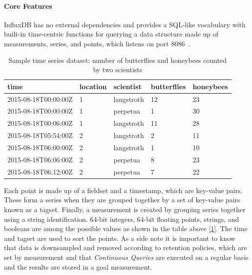 \paragraph{Core Features}
InfluxDB has no external dependencies and provides a SQL-like vocabulary with built-in time-centric functions for querying a data structure made up of measurements, series, and points, which listens on port 8086~\cite{Misc:influx_docs}.

\begin{table}[ht]
    \centering
    \begin{tabular}{|l|l|l|l|l|}
        \hline
        time                 & location & scientist  & butterflies & honeybees \\ \hline
        2015-08-18T00:00:00Z & 1        & langstroth & 12          & 23        \\ \hline
        2015-08-18T00:00:00Z & 1        & perpetua   & 1           & 30        \\ \hline
        2015-08-18T00:06:00Z & 1        & langstroth & 11          & 28        \\ \hline
        2015-08-18T05:54:00Z & 2        & langstroth & 2           & 11        \\ \hline
        2015-08-18T06:00:00Z & 2        & langstroth & 1           & 10        \\ \hline
        2015-08-18T06:06:00Z & 2        & perpetua   & 8           & 23        \\ \hline
        2015-08-18T06:12:00Z & 2        & perpetua   & 7           & 22        \\ \hline
    \end{tabular}
    \caption{Sample time series dataset: number of butterflies and honeybees counted by two scientists}\label{tab:influx_example}
\end{table}
Each point is made up of a fieldset and a timestamp, which are key-value pairs. These form a series when they are grouped together by a set of key-value pairs known as a tagset. Finally, a measurement is created by grouping series together using a string identification.
64-bit integers, 64-bit floating points, strings, and booleans are among the possible values as shown in the table above [\ref{tab:influx_example}]. The time and tagset are used to sort the points.
As a side note it is important to know that data is downsampled and removed according to retention policies, which are set by measurement and that \textit{Continuous Queries} are executed on a regular basis and the results are stored in a goal measurement.

